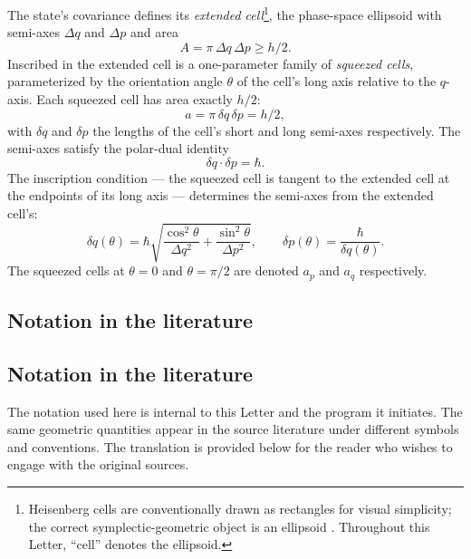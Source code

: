 \documentclass[%
  aps, amsmath, amssymb, onecolumn, 11pt
]{revtex4-2}
\begin{document}
The state's covariance defines its \emph{extended cell}\footnote{Heisenberg cells are conventionally drawn as rectangles for visual simplicity; the correct symplectic-geometric object is an ellipsoid \cite{degosson2013qblobs, degossoncharlyne2022}. Throughout this Letter, ``cell'' denotes the ellipsoid.}, the phase-space ellipsoid with semi-axes $\Delta q$ and $\Delta p$ and area
\begin{equation}
A = \pi \, \Delta q \, \Delta p \geq h/2.
\label{eq:extended_cell}
\end{equation}
Inscribed in the extended cell is a one-parameter family of \emph{squeezed cells}, parameterized by the orientation angle $\theta$ of the cell's long axis relative to the $q$-axis. Each squeezed cell has area exactly $h/2$:
\begin{equation}
a = \pi \, \delta q \, \delta p = h/2,
\label{eq:squeezed_cell}
\end{equation}
with $\delta q$ and $\delta p$ the lengths of the cell's short and long semi-axes respectively. The semi-axes satisfy the polar-dual identity
\begin{equation}
\delta q \cdot \delta p = \hbar.
\label{eq:polar_dual}
\end{equation}
The inscription condition --- the squeezed cell is tangent to the extended cell at the endpoints of its long axis --- determines the semi-axes from the extended cell's:
\begin{equation}
\delta q(\theta) = \hbar \sqrt{ \frac{\cos^2\theta}{\Delta q^2} + \frac{\sin^2\theta}{\Delta p^2} }, \qquad \delta p(\theta) = \frac{\hbar}{\delta q(\theta)}.
\label{eq:semi_axes_theta}
\end{equation}
The squeezed cells at $\theta = 0$ and $\theta = \pi/2$ are denoted $a_p$ and $a_q$ respectively.

\subsection{Notation in the literature}
\label{sec:translation}

\subsection{Notation in the literature}
\label{sec:translation}

The notation used here is internal to this Letter and the program it initiates. The same geometric quantities appear in the source literature under different symbols and conventions. The translation is provided below for the reader who wishes to engage with the original sources.
\end{document}
